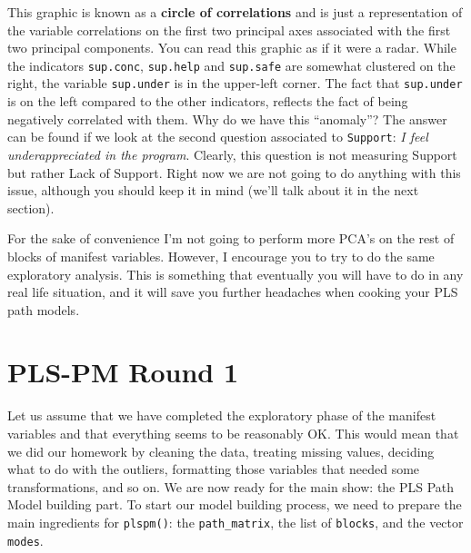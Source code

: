 \documentclass[12pt]{book}\usepackage{graphicx, color}
\newcommand{\fplspm}{\texttt{plspm()}}
\newcommand{\code}[1]{\texttt{#1}}
\begin{document}
This graphic is known as a \textbf{circle of correlations} and is just a representation of the variable correlations on the first two principal axes associated with the first two principal components. You can read this graphic as if it were a radar. While the indicators \code{sup.conc}, \code{sup.help} and \code{sup.safe} are somewhat clustered on the right, the variable \code{sup.under} is in the upper-left corner. The fact that \code{sup.under} is on the left compared to the other indicators, reflects the fact of being negatively correlated with them. Why do we have this ``anomaly''? The answer can be found if we look at the second question associated to \code{Support}: \textit{I feel underappreciated in the program}. Clearly, this question is not measuring Support but rather Lack of Support. Right now we are not going to do anything with this issue, although you should keep it in mind (we'll talk about it in the next section).

For the sake of convenience I'm not going to perform more PCA's on the rest of blocks of manifest variables. However, I encourage you to try to do the same exploratory analysis. This is something that eventually you will have to do in any real life situation, and it will save you further headaches when cooking your PLS path models.



\section{PLS-PM Round 1}
Let us assume that we have completed the exploratory phase of the manifest variables and that everything seems to be reasonably OK. This would mean that we did our homework by cleaning the data, treating missing values, deciding what to do with the outliers, formatting those variables that needed some transformations, and so on. We are now ready for the main show: the PLS Path Model building part. To start our model building process, we need to prepare the main ingredients for \fplspm{}: the \code{path\_matrix}, the list of \code{blocks}, and the vector \code{modes}.
\end{document}
